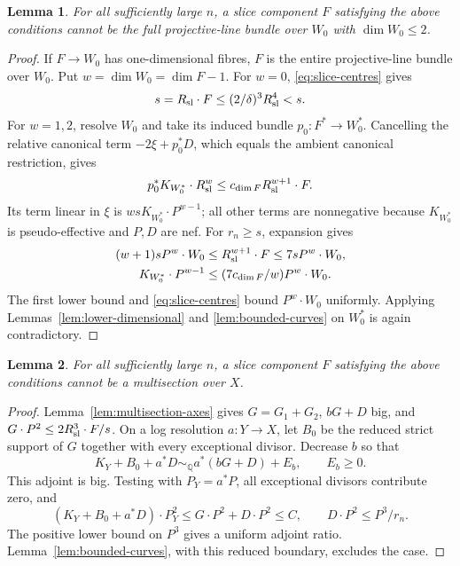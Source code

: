 \documentclass[12pt,a4paper,psamsfonts]{amsart}
\theoremstyle{definition}
\theoremstyle{plain}
\newtheorem{lemma}{Lemma}[section]
\newcommand{\Q}{\mathbb Q}
\begin{document}
\begin{lemma}\label{lem:saturated-slices}
For all sufficiently large $n$, a slice component $F$ satisfying
the above conditions cannot be the full projective-line bundle over $W_0$ with $\dim W_0\le2$.
\end{lemma}
\begin{proof}
If $F\to W_0$ has one-dimensional fibres, $F$ is the entire
projective-line bundle over $W_0$. Put $w=\dim W_0=\dim F-1$.
For $w=0$, \eqref{eq:slice-centres} gives
\[
 s=R_{\rm sl}\cdot F\le(2/\delta)^3R_{\rm sl}^4<s.
\]
For $w=1,2$, resolve $W_0$ and take its induced bundle
$p_0:F^*\to W_0^*$. Cancelling the relative canonical term
$-2\xi+p_0^*D$, which equals the ambient canonical restriction,
gives
\[
 p_0^*K_{W_0^*}\cdot R_{\rm sl}^w\le c_{\dim F}R_{\rm sl}^{w+1}\cdot F.
\]
Its term linear in $\xi$ is $wsK_{W_0^*}\cdot P^{w-1}$; all other
terms are nonnegative because $K_{W_0^*}$ is pseudo-effective
and $P,D$ are nef. For $r_n\ge s$, expansion gives
\begin{equation}\label{eq:saturated-estimate}
 \begin{split}
 (w+1)sP^w\cdot W_0&\le R_{\rm sl}^{w+1}\cdot F\le7sP^w\cdot W_0,\\
 K_{W_0^*}\cdot P^{w-1}&\le(7c_{\dim F}/w)P^w\cdot W_0.
 \end{split}
\end{equation}
The first lower bound and \eqref{eq:slice-centres} bound $P^w\cdot W_0$
uniformly. Applying Lemmas~\ref{lem:lower-dimensional} and
\ref{lem:bounded-curves} on $W_0^*$ is again contradictory.
\end{proof}

\begin{lemma}\label{lem:multisection-slices}
For all sufficiently large $n$, a slice component $F$ satisfying
the above conditions cannot be a multisection over $X$.
\end{lemma}
\begin{proof}
Lemma~\ref{lem:multisection-axes} gives $G=G_1+G_2$, $bG+D$ big,
and $G\cdot P^2\le2R_{\rm sl}^3\cdot F/s$. On a log resolution $a:Y\to X$,
let $B_0$ be the reduced strict support of $G$ together with every
exceptional divisor. Decrease $b$ so that
\[
 K_Y+B_0+a^*D\sim_\Q a^*(bG+D)+E_b,\qquad E_b\ge0.
\]
This adjoint is big. Testing with $P_Y=a^*P$, all exceptional
divisors contribute zero, and
\[
 (K_Y+B_0+a^*D)\cdot P_Y^2\le G\cdot P^2+D\cdot P^2\le C,
 \qquad D\cdot P^2\le P^3/r_n.
\]
The positive lower bound on $P^3$ gives a uniform adjoint ratio.
Lemma~\ref{lem:bounded-curves}, with this reduced boundary,
excludes the case.
\end{proof}
\end{document}
